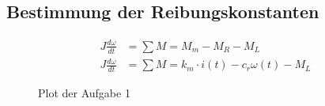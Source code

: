 \subsection{Bestimmung der Reibungskonstanten}

\begin{equation} \label{eq221}
    \begin{split}
        J \frac{d \omega}{d t} &= \sum M = M_m - M_R - M_L \\
        J \frac{d \omega}{d t} &= \sum M = k_m \cdot i(t) - c_r \omega (t) - M_L 
    \end{split}
\end{equation}

\begin{figure}[H]
 \centering
 \caption{Plot der Aufgabe 1}
 \label{fig:PlotAufgabe1}
\end{figure}
